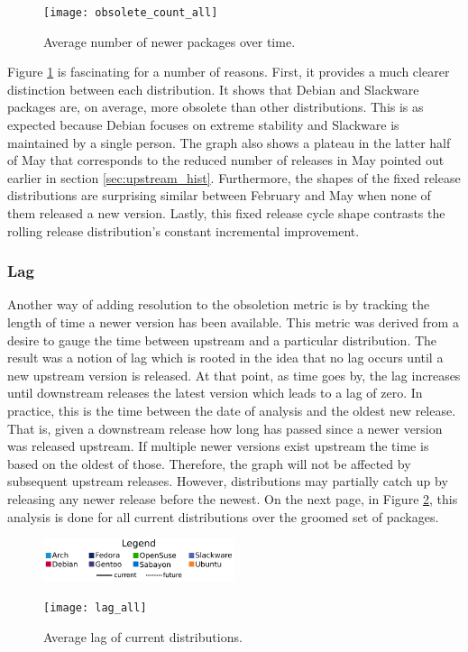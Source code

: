 \documentclass[letterpaper,10pt]{article}
\begin{document}
\begin{figure}[htbp!]
\texttt{[image: obsolete\_count\_all]}
\caption{Average number of newer packages over time.}
\label{fig:avg_newer}
\end{figure}

Figure \ref{fig:avg_newer} is fascinating for a number of reasons.  First, it provides a much clearer distinction between each distribution.  It shows that Debian and Slackware packages are, on average, more obsolete than other distributions.  This is as expected because Debian focuses on extreme stability and Slackware is maintained by a single person.  The graph also shows a plateau in the latter half of May that corresponds to the reduced number of releases in May pointed out earlier in section \ref{sec:upstream_hist}.  Furthermore, the shapes of the fixed release distributions are surprising similar between February and May when none of them released a new version.  Lastly, this fixed release cycle shape contrasts the rolling release distribution's constant incremental improvement.
\subsubsection{Lag}
Another way of adding resolution to the obsoletion metric is by tracking the length of time a newer version has been available.  This metric was derived from a desire to gauge the time between upstream and a particular distribution.  The result was a notion of lag which is rooted in the idea that no lag occurs until a new upstream version is released.  At that point, as time goes by, the lag increases until downstream releases the latest version which leads to a lag of zero.  In practice, this is the time between the date of analysis and the oldest new release.  That is, given a downstream release how long has passed since a newer version was released upstream.  If multiple newer versions exist upstream the time is based on the oldest of those.  Therefore, the graph will not be affected by subsequent upstream releases.  However, distributions may partially catch up by releasing any newer release before the newest.  On the next page, in Figure \ref{fig:lag_all}, this analysis is done for all current distributions over the groomed set of packages.

\begin{figure}[htbb!]
\begin{center}
\includegraphics[width=0.5\textwidth]{legend2}
\end{center}
\texttt{[image: lag\_all]}
\caption{Average lag of current distributions.}
\label{fig:lag_all}
\end{figure}
\end{document}
